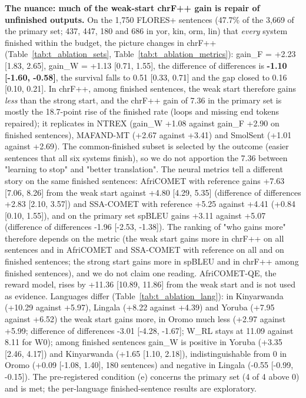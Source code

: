 \textbf{The nuance: much of the weak-start chrF++ gain is repair of unfinished outputs.} On the 1,750 FLORES+ sentences (47.7\% of the 3,669 of the primary set; 437, 447, 180 and 686 in yor, kin, orm, lin) that \emph{every} system finished within the budget, the picture changes in chrF++ (Table~\ref{tab:t_ablation_sets}, Table~\ref{tab:t_ablation_metrics}): gain\_F = +2.23 {[}1.83, 2.65{]}, gain\_W = +1.13 {[}0.71, 1.55{]}, the difference of differences is \textbf{-1.10 {[}-1.60, -0.58{]}}, the survival falls to 0.51 {[}0.33, 0.71{]} and the gap closed to 0.16 {[}0.10, 0.21{]}. In chrF++, among finished sentences, the weak start therefore gains \emph{less} than the strong start, and the chrF++ gain of 7.36 in the primary set is mostly the 18.7-point rise of the finished rate (loops and missing end tokens repaired); it replicates in NTREX (gain\_W +1.08 against gain\_F +2.90 on finished sentences), MAFAND-MT (+2.67 against +3.41) and SmolSent (+1.01 against +2.69). The common-finished subset is selected by the outcome (easier sentences that all six systems finish), so we do not apportion the 7.36 between "learning to stop" and "better translation". The neural metrics tell a different story on the same finished sentences: AfriCOMET with reference gains +7.63 {[}7.06, 8.26{]} from the weak start against +4.80 {[}4.29, 5.35{]} (difference of differences +2.83 {[}2.10, 3.57{]}) and SSA-COMET with reference +5.25 against +4.41 (+0.84 {[}0.10, 1.55{]}), and on the primary set spBLEU gains +3.11 against +5.07 (difference of differences -1.96 {[}-2.53, -1.38{]}). The ranking of "who gains more" therefore depends on the metric (the weak start gains more in chrF++ on all sentences and in AfriCOMET and SSA-COMET with reference on all and on finished sentences; the strong start gains more in spBLEU and in chrF++ among finished sentences), and we do not claim one reading. AfriCOMET-QE, the reward model, rises by +11.36 {[}10.89, 11.86{]} from the weak start and is not used as evidence. Languages differ (Table~\ref{tab:t_ablation_lang}): in Kinyarwanda (+10.29 against +5.97), Lingala (+8.22 against +4.39) and Yoruba (+7.95 against +6.52) the weak start gains more, in Oromo much less (+2.97 against +5.99; difference of differences -3.01 {[}-4.28, -1.67{]}; W\_RL stays at 11.09 against 8.11 for W0); among finished sentences gain\_W is positive in Yoruba (+3.35 {[}2.46, 4.17{]}) and Kinyarwanda (+1.65 {[}1.10, 2.18{]}), indistinguishable from 0 in Oromo (+0.09 {[}-1.08, 1.40{]}, 180 sentences) and negative in Lingala (-0.55 {[}-0.99, -0.15{]}). The pre-registered condition (e) concerns the primary set (4 of 4 above 0) and is met; the per-language finished-sentence results are exploratory.

